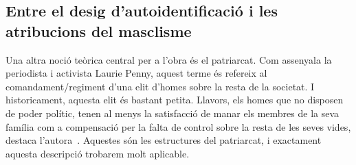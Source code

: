\begin{comment}
--hier oder Unterkapitel "intertextualitaet" oder aehnlich in language

Qui es català?

* estereotips: die Mutter kann und tut nur putzen und kochen und ihren Mann gehorchen obwohl er sich ungeheuerlich verhaelt; der Vater ist richtig ueberzogen als Arsch dargestellt, der seine Familie schlaegt, rumvoegelt und absurde Vorstellungen von Ehre, Ehe und Familie hat;
--> vlt sind die stereotypen so überzogen um den inneren (und äußeren) konflikt noch drastischer hervorzuheben?
    vlt auch um ihre Absurdität aufzuzeigen?

"Jo hi volia anar, a veure Isabel [...] i així podria saber quina cara feia una dona com aquella. Lletja, segur. Havia de ser lletja i pudent, com havia dit la mare tantes vegades que eren les dones que mengen porc." (p.185)
--estereotips (dones cristianes, dones musulmanes, gegen einander ausgespielt)

"La mare sempre deia que hauries d'estar fent això o hauries d'estar fent allò altre i jo ja havia vist que les nenes de la meva edat no sabien ni agafar bé una escombra i que no tenien cap interès a aprendre'n." (p.239)
-- entre cultures: com són les amigues

\end{comment}

\subsection{Entre el desig d'autoidentificació i les atribucions del masclisme}

\begin{comment}
  1) autoidentificació
  buscant la seva identitat
  * religió
  * literatura

  2) les atribucions
  * com han de ser les nenes/les dones?
    ** alleine fuer die ganze care arbeit zustaendig, wird als natuerliche neigung inszeniert
  * les dones i les "altres" són culpables per tot (vgl Laurie Penny)
    --> keine Solidaritaet zwischen den Frauen (zb la mare i les amants) moeglich, obwohl sie alle Opfer sind; sie werden gegen einander ausgespielt
  * frauen werden auf ihr aeusseres reduziert
  * die frauen wuerden nie genuegen;
\end{comment}

Una altra noció teòrica central per a l'obra és el patriarcat.
Com assenyala la periodista i activista Laurie Penny, aquest terme és refereix al comandament/regiment d'una elit d'homes sobre la resta de la societat.
I historicament, aquesta elit és bastant petita.
Llavors, els homes que no disposen de poder polític, tenen al menys la satisfacció de manar els membres de la seva família com a compensació per la falta de control sobre la resta de les seves vides, destaca l'autora~\autocite[69-70]{Penny2014}.
Aquestes són les estructures del patriarcat, i exactament aquesta descripció trobarem molt aplicable.

